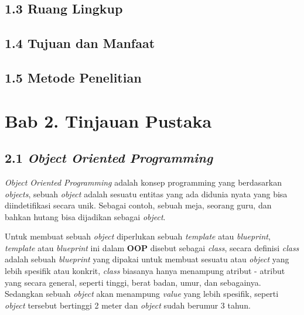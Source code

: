 \documentclass[a4paper]{article}
\begin{document}
\subsection*{1.3 Ruang Lingkup}

\subsection*{1.4 Tujuan dan Manfaat}

\subsection*{1.5 Metode Penelitian}

\newpage
\section*{Bab 2. Tinjauan Pustaka}


\subsection*{2.1 \textit{Object Oriented Programming}}
\textit{Object Oriented Programming} adalah konsep programming yang berdasarkan \textit{objects}, sebuah \textit{object} adalah sesuatu entitas yang ada didunia nyata yang bisa diindetifikasi secara unik\autocite{liang_liang_2021}. Sebagai contoh, sebuah meja, seorang guru, dan bahkan hutang bisa dijadikan sebagai \textit{object}. 

Untuk membuat sebuah \textit{object} diperlukan sebuah \textit{template} atau \textit{blueprint}, \textit{template} atau \textit{blueprint} ini dalam \textbf{OOP} disebut sebagai \textit{class}, secara definisi \textit{class} adalah sebuah \textit{blueprint} yang dipakai untuk membuat sesuatu atau \textit{object} yang lebih spesifik atau konkrit\autocite{education-erin-oop-2020}, \textit{class} biasanya hanya menampung atribut - atribut yang secara general, seperti tinggi, berat badan, umur, dan sebagainya. Sedangkan sebuah \textit{object} akan menampung \textit{value} yang lebih spesifik, seperti \textit{object} tersebut bertinggi 2 meter dan \textit{object} sudah berumur 3 tahun.
\end{document}
